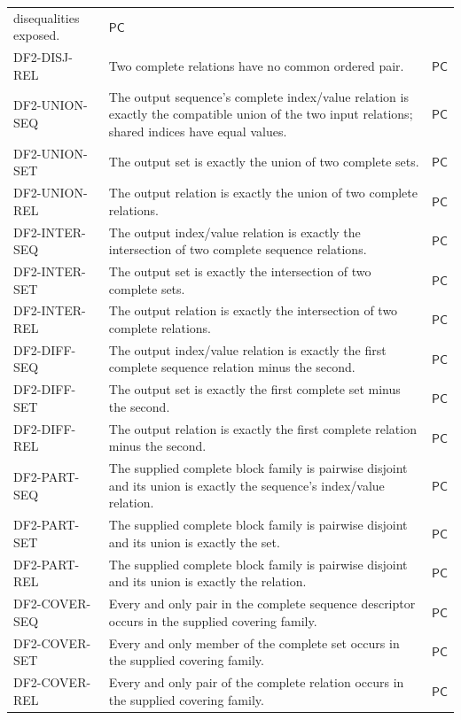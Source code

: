 \documentclass[11pt,twoside]{article}
\begin{document}
\begin{longtable}{>{\raggedright\arraybackslash}p{}
                  >{\raggedright\arraybackslash}p{}
                  >{\raggedright\arraybackslash}p{}}
disequalities exposed. & \(\mathsf{PC}\)\\
DF2-DISJ-REL & Two complete relations have no common ordered pair. &
\(\mathsf{PC}\)\\
DF2-UNION-SEQ & The output sequence's complete index/value relation is exactly the
compatible union of the two input relations; shared indices have equal values. &
\(\mathsf{PC}\)\\
DF2-UNION-SET & The output set is exactly the union of two complete sets. &
\(\mathsf{PC}\)\\
DF2-UNION-REL & The output relation is exactly the union of two complete
relations. & \(\mathsf{PC}\)\\
DF2-INTER-SEQ & The output index/value relation is exactly the intersection of two
complete sequence relations. & \(\mathsf{PC}\)\\
DF2-INTER-SET & The output set is exactly the intersection of two complete sets.
& \(\mathsf{PC}\)\\
DF2-INTER-REL & The output relation is exactly the intersection of two complete
relations. & \(\mathsf{PC}\)\\
DF2-DIFF-SEQ & The output index/value relation is exactly the first complete
sequence relation minus the second. & \(\mathsf{PC}\)\\
DF2-DIFF-SET & The output set is exactly the first complete set minus the second.
& \(\mathsf{PC}\)\\
DF2-DIFF-REL & The output relation is exactly the first complete relation minus
the second. & \(\mathsf{PC}\)\\
DF2-PART-SEQ & The supplied complete block family is pairwise disjoint and its
union is exactly the sequence's index/value relation. & \(\mathsf{PC}\)\\
DF2-PART-SET & The supplied complete block family is pairwise disjoint and its
union is exactly the set. & \(\mathsf{PC}\)\\
DF2-PART-REL & The supplied complete block family is pairwise disjoint and its
union is exactly the relation. & \(\mathsf{PC}\)\\
DF2-COVER-SEQ & Every and only pair in the complete sequence descriptor occurs in
the supplied covering family. & \(\mathsf{PC}\)\\
DF2-COVER-SET & Every and only member of the complete set occurs in the supplied
covering family. & \(\mathsf{PC}\)\\
DF2-COVER-REL & Every and only pair of the complete relation occurs in the
supplied covering family. & \(\mathsf{PC}\)\\
\bottomrule
\end{longtable}
\end{document}
